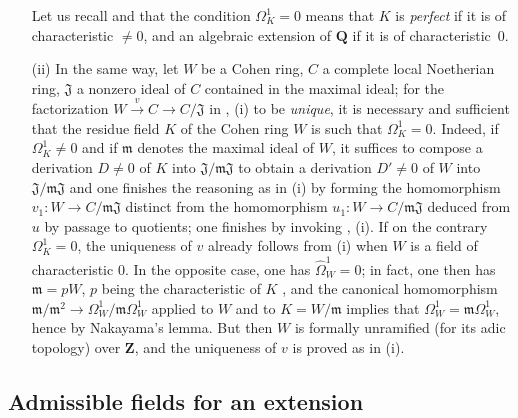 \begin{remarks}[21.5.3]
\begin{enumerate}
    Let us recall  and  that the condition $\Omega^1_K=0$ means that $K$ is \emph{perfect} if it is of characteristic $\neq 0$, and an algebraic extension of $\mathbf{Q}$ if it is of characteristic~$0$.
  \item[(ii)] In the same way, let $W$ be a Cohen ring, $C$ a complete local Noetherian ring, $\mathfrak{J}$ a nonzero ideal of $C$ contained in the maximal ideal; for the factorization $W\xrightarrow{v} C\to C/\mathfrak{J}$ in , (i) to be \emph{unique}, it is necessary and sufficient that the residue field $K$ of the Cohen ring $W$ is such that $\Omega^1_K=0$.
    Indeed, if $\Omega^1_K\neq 0$ and if $\mathfrak{m}$ denotes the maximal ideal of $W$, it suffices to compose a derivation $D\neq 0$ of $K$ into $\mathfrak{J}/\mathfrak{m}\mathfrak{J}$ to obtain a derivation $D'\neq 0$ of $W$ into $\mathfrak{J}/\mathfrak{m}\mathfrak{J}$ and one finishes the reasoning as in (i) by forming the homomorphism $v_1:W\to C/\mathfrak{m}\mathfrak{J}$ distinct from the homomorphism $u_1:W\to C/\mathfrak{m}\mathfrak{J}$ deduced from $u$ by passage to quotients; one finishes by invoking , (i).
    If on the contrary $\Omega^1_K=0$, the uniqueness of $v$ already follows from (i) when $W$ is a field of characteristic $0$.
    In the opposite case, one has $\widehat{\Omega}^1_W=0$; in fact, one then has $\mathfrak{m}=pW$, $p$ being the characteristic of $K$ , and the canonical homomorphism $\mathfrak{m}/\mathfrak{m}^2\to\Omega^1_W/\mathfrak{m}\Omega^1_W$  applied to $W$ and to $K=W/\mathfrak{m}$ implies that $\Omega^1_W=\mathfrak{m}\Omega^1_W$, hence by Nakayama's lemma.
    But then  $W$ is formally unramified (for its adic topology) over $\mathbf{Z}$, and the uniqueness of $v$ is proved as in (i).
\end{enumerate}
\end{remarks}

\subsection{Admissible fields for an extension}
\label{subsection:0.21.6}

